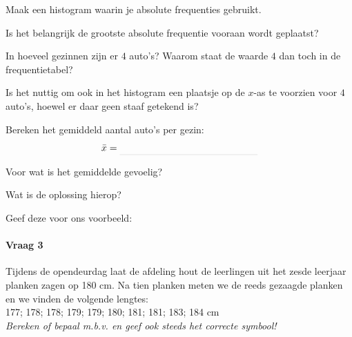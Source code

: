 \documentclass[12pt,twoside,a4paper]{article}
\begin{document}
Maak een histogram waarin je absolute frequenties gebruikt.

\begin{center}
\end{center}

Is het belangrijk de grootste absolute frequentie vooraan wordt geplaatst?

In hoeveel gezinnen zijn er $4$ auto's? \arulefill
Waarom staat de waarde $4$ dan toch in de frequentietabel?

Is het nuttig om ook in het histogram een plaatsje op de $x$-as te voorzien voor $4$ auto's, hoewel er daar geen staaf getekend is?

Bereken het gemiddeld aantal auto's per gezin:
$$\bar{x}=\arule{5cm}$$

Voor wat is het gemiddelde gevoelig? \arulefill

Wat is de oplossing hierop? \arulefill

Geef deze voor ons voorbeeld: \arulefill

\newpage
\paragraph{Vraag 3}
Tijdens de opendeurdag laat de afdeling hout de leerlingen uit het zesde leerjaar planken zagen op 180 cm. Na tien planken meten we de reeds gezaagde planken en we vinden de volgende lengtes:\\
177; 178; 178; 179; 179; 180; 181; 181; 183; 184 cm\\

{\em Bereken of bepaal m.b.v.  en geef ook steeds het correcte symbool!}
\end{document}
